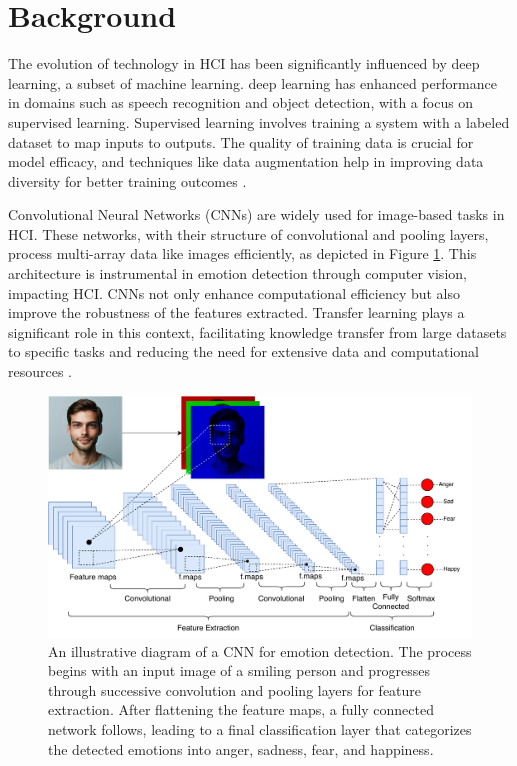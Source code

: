 \documentclass[runningheads]{llncs}
\begin{document}
\section{Background}
\label{sec:background}

The evolution of technology in HCI has been significantly influenced by deep learning, a subset of machine learning. deep learning has enhanced performance in domains such as speech recognition and object detection, with a focus on supervised learning. Supervised learning involves training a system with a labeled dataset to map inputs to outputs. The quality of training data is crucial for model efficacy, and techniques like data augmentation help in improving data diversity for better training outcomes \cite{Alrowais2023, Martinez2017, Lecun2015, Mahony2020, Shorten2019, Khalifa2022}.

Convolutional Neural Networks (CNNs) are widely used for image-based tasks in HCI. These networks, with their structure of convolutional and pooling layers, process multi-array data like images efficiently, as depicted in Figure \ref{fig:cnnarchitecture}. This architecture is instrumental in emotion detection through computer vision, impacting HCI. CNNs not only enhance computational efficiency but also improve the robustness of the features extracted. Transfer learning plays a significant role in this context, facilitating knowledge transfer from large datasets to specific tasks and reducing the need for extensive data and computational resources \cite{Lecun2015, Khan2020}.

\begin{figure}[htb]
\centering
\includegraphics[width=0.97\linewidth]{CNNArchitecture.pdf}
\caption{An illustrative diagram of a CNN for emotion detection. The process begins with an input image of a smiling person and progresses through successive convolution and pooling layers for feature extraction. After flattening the feature maps, a fully connected network follows, leading to a final classification layer that categorizes the detected emotions into anger, sadness, fear, and happiness.}
\label{fig:cnnarchitecture}
\end{figure}
\end{document}
